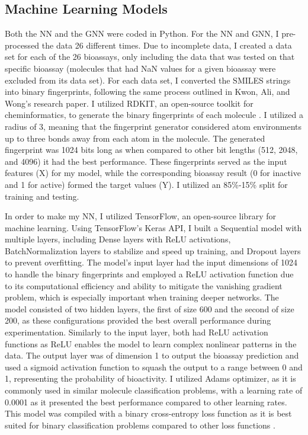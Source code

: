 \documentclass[10pt,twocolumn]{article}
\begin{document}
\subsection{Machine Learning Models}

Both the NN and the GNN were coded in Python. For the NN and GNN, I pre-processed the data 26 different times. Due to incomplete data, I created a data set for each of the 26 bioassays, only including the data that was tested on that specific bioassay (molecules that had NaN values for a given bioassay were excluded from its data set). For each data set, I converted the SMILES strings into binary fingerprints, following the same process outlined in Kwon, Ali, and Wong’s research paper. I utilized RDKIT, an open-source toolkit for cheminformatics, to generate the binary fingerprints of each molecule \textcite{rdkit}. I utilized a radius of 3, meaning that the fingerprint generator considered atom environments up to three bonds away from each atom in the molecule. The generated fingerprint was 1024 bits long as when compared to other bit lengths (512, 2048, and 4096) it had the best performance. These fingerprints served as the input features (X) for my model, while the corresponding bioassay result (0 for inactive and 1 for active) formed the target values (Y). I utilized an 85\%-15\% split for training and testing. 

In order to make my NN, I utilized TensorFlow, an open-source library for machine learning. Using TensorFlow’s Keras API, I built a Sequential model with multiple layers, including Dense layers with ReLU activations, BatchNormalization layers to stabilize and speed up training, and Dropout layers to prevent overfitting. The model’s input layer had the input dimensions of 1024 to handle the binary fingerprints and employed a ReLU activation function due to its computational efficiency and ability to mitigate the vanishing gradient problem, which is especially important when training deeper networks. The model consisted of two hidden layers, the first of size 600 and the second of size 200, as these configurations provided the best overall performance during experimentation. Similarly to the input layer, both had ReLU activation functions as ReLU enables the model to learn complex nonlinear patterns in the data. The output layer was of dimension 1 to output the bioassay prediction and used a sigmoid activation function to squash the output to a range between 0 and 1, representing the probability of bioactivity. I utilized Adams optimizer, as it is commonly used in similar molecule classification problems, with a learning rate of 0.0001 as it presented the best performance compared to other learning rates. This model was compiled with a binary cross-entropy loss function as it is best suited for binary classification problems compared to other loss functions \textcite{loss}. 
\end{document}
